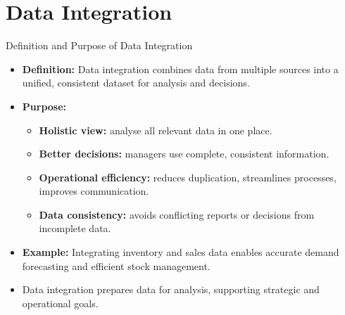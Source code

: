 \documentclass[aspectratio=169, table]{beamer}
\begin{document}
\section{Data Integration}

\begin{frame}{Definition and Purpose of Data Integration}
	\vspace{20pt}
	
	\begin{itemize}
		\item \textbf{Definition:} Data integration combines data from multiple sources into a unified, consistent dataset for analysis and decisions.
		
		\item \textbf{Purpose:}
		\begin{itemize}
			\item \textbf{Holistic view:} analyse all relevant data in one place.
			\item \textbf{Better decisions:} managers use complete, consistent information.
			\item \textbf{Operational efficiency:} reduces duplication, streamlines processes, improves communication.
			\item \textbf{Data consistency:} avoids conflicting reports or decisions from incomplete data.
		\end{itemize}
		
		\item \textbf{Example:} Integrating inventory and sales data enables accurate demand forecasting and efficient stock management.
		
		\item Data integration prepares data for analysis, supporting strategic and operational goals.
	\end{itemize}
	
\end{frame}
\end{document}
